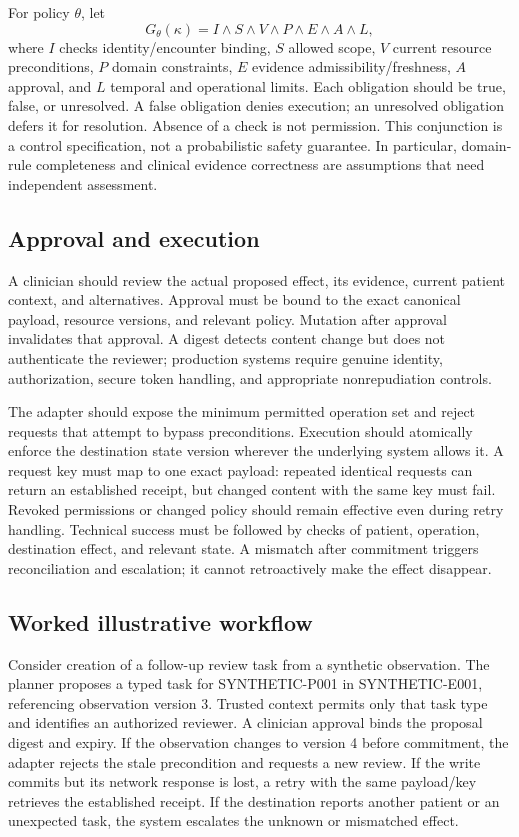 For policy $\theta$, let
\begin{equation}
G_\theta(\kappa)=I\wedge S\wedge V\wedge P\wedge E\wedge A\wedge L,
\end{equation}
where $I$ checks identity/encounter binding, $S$ allowed scope, $V$ current resource preconditions, $P$ domain constraints, $E$ evidence admissibility/freshness, $A$ approval, and $L$ temporal and operational limits. Each obligation should be true, false, or unresolved. A false obligation denies execution; an unresolved obligation defers it for resolution. Absence of a check is not permission. This conjunction is a control specification, not a probabilistic safety guarantee. In particular, domain-rule completeness and clinical evidence correctness are assumptions that need independent assessment.

\subsection{Approval and execution}
A clinician should review the actual proposed effect, its evidence, current patient context, and alternatives. Approval must be bound to the exact canonical payload, resource versions, and relevant policy. Mutation after approval invalidates that approval. A digest detects content change but does not authenticate the reviewer; production systems require genuine identity, authorization, secure token handling, and appropriate nonrepudiation controls.

The adapter should expose the minimum permitted operation set and reject requests that attempt to bypass preconditions. Execution should atomically enforce the destination state version wherever the underlying system allows it. A request key must map to one exact payload: repeated identical requests can return an established receipt, but changed content with the same key must fail. Revoked permissions or changed policy should remain effective even during retry handling. Technical success must be followed by checks of patient, operation, destination effect, and relevant state. A mismatch after commitment triggers reconciliation and escalation; it cannot retroactively make the effect disappear.

\subsection{Worked illustrative workflow}
Consider creation of a follow-up review task from a synthetic observation. The planner proposes a typed task for SYNTHETIC-P001 in SYNTHETIC-E001, referencing observation version 3. Trusted context permits only that task type and identifies an authorized reviewer. A clinician approval binds the proposal digest and expiry. If the observation changes to version 4 before commitment, the adapter rejects the stale precondition and requests a new review. If the write commits but its network response is lost, a retry with the same payload/key retrieves the established receipt. If the destination reports another patient or an unexpected task, the system escalates the unknown or mismatched effect.

